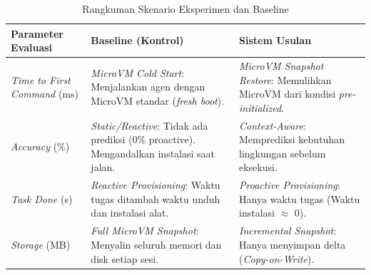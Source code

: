 \begin{table}[!ht]
\centering
\footnotesize
\caption{Rangkuman Skenario Eksperimen dan Baseline}
\label{tab:skenario-baseline}
\begin{tabular}{|p{3cm}|p{4cm}|p{4cm}|}
\hline
\textbf{Parameter Evaluasi} & \textbf{Baseline (Kontrol)} & \textbf{Sistem Usulan} \\
\hline
\textit{Time to First Command} (ms) & \textit{MicroVM Cold Start}: Menjalankan agen dengan MicroVM standar (\textit{fresh boot}). & \textit{MicroVM Snapshot Restore}: Memulihkan MicroVM dari kondisi \textit{pre-initialized}.\\
\hline
\textit{Accuracy} (\%) & \textit{Static/Reactive}: Tidak ada prediksi (0\% proactive). Mengandalkan instalasi saat jalan. & \textit{Context-Aware}: Memprediksi kebutuhan lingkungan sebelum eksekusi. \\
\hline
\textit{Task Done} (s) & \textit{Reactive Provisioning}: Waktu tugas ditambah waktu unduh dan instalasi alat. & \textit{Proactive Provisioning}: Hanya waktu tugas (Waktu instalasi $\approx$ 0). \\
\hline
\textit{Storage} (MB) & \textit{Full MicroVM Snapshot}: Menyalin seluruh memori dan disk setiap sesi. & \textit{Incremental Snapshot}: Hanya menyimpan delta (\textit{Copy-on-Write}). \\
\hline
\end{tabular}
\end{table}


